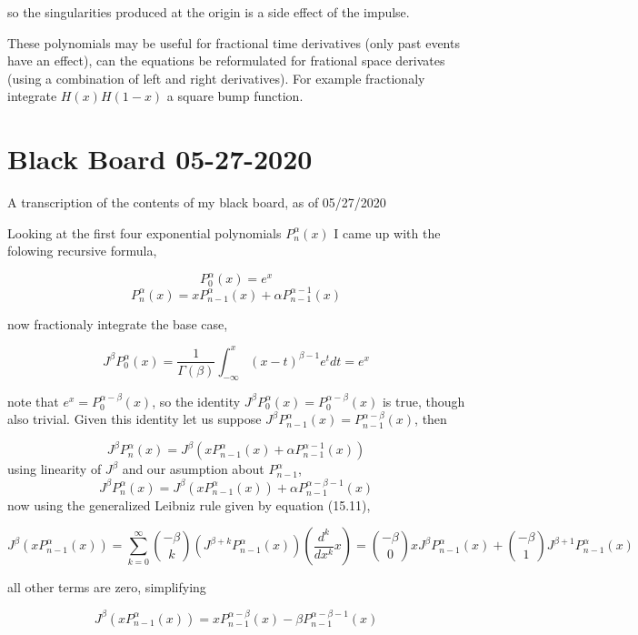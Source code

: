 \documentclass[%
 preprint,
 amsmath, amssymb, aps, pra, 10pt
]{revtex4-2}
\begin{document}
so the singularities produced at the origin is a side effect of the impulse.

These polynomials may be useful for fractional time derivatives (only past events have an effect), can the equations be reformulated for frational space derivates (using a combination of left and right derivatives). For example fractionaly integrate $H(x)H(1-x)$ a square bump function.


\section{Black Board 05-27-2020}

A transcription of the contents of my black board, as of 05/27/2020

Looking at the first four exponential polynomials $P_n^\alpha(x)$ I came up with the folowing recursive formula,

\[
P_{0}^{\alpha}(x) = e^x
\]
\begin{equation}
P_n^\alpha(x) = xP_{n-1}^\alpha(x) + \alpha P_{n-1}^{\alpha - 1}(x)
\label{polynomial_exponential_recursive}
\end{equation}

now fractionaly integrate the base case,

\[J^\beta P_0^\alpha(x) = \frac{1}{\Gamma(\beta)}\int_{-\infty}^x \left(x - t\right)^{\beta - 1}e^{t}dt = e^x\]

note that $e^x = P_0^{\alpha - \beta}(x)$, so the identity $J^\beta P_0^\alpha(x) = P_0^{\alpha - \beta}(x)$ is true, though also trivial. Given this identity let us suppose $J^\beta P_{n-1}^\alpha(x) = P_{n - 1}^{\alpha - \beta}(x)$, then

\[J^\beta P_n^\alpha(x) = J^\beta \left(xP_{n - 1}^\alpha(x) + \alpha P_{n - 1}^{\alpha - 1}(x)\right)\]
using linearity of $J^\beta$ and our asumption about $P_{n - 1}^\alpha$,
\[J^\beta P_n^\alpha(x) = J^\beta \left(xP_{n - 1}^\alpha(x)\right) + \alpha P_{n - 1}^{\alpha - \beta - 1}(x)\]
now using the generalized Leibniz rule given by \cite{Leibniz} equation (15.11),

\[
J^\beta \left(xP_{n - 1}^\alpha(x)\right) = \sum_{k=0}^{\infty} \binom{-\beta}{k}\left(J^{\beta + k}P_{n - 1}^\alpha(x)\right)\left(\frac{d^k}{dx^k}x\right) = \binom{-\beta}{0}xJ^\beta P_{n - 1}^\alpha(x) + \binom{-\beta}{1}J^{\beta + 1}P_{n - 1}^\alpha(x)
\]

all other terms are zero, simplifying

\[
J^\beta \left(xP_{n - 1}^\alpha(x)\right) = xP_{n - 1}^{\alpha - \beta}(x) - \beta P_{n - 1}^{\alpha - \beta - 1}(x)
\]
\end{document}
